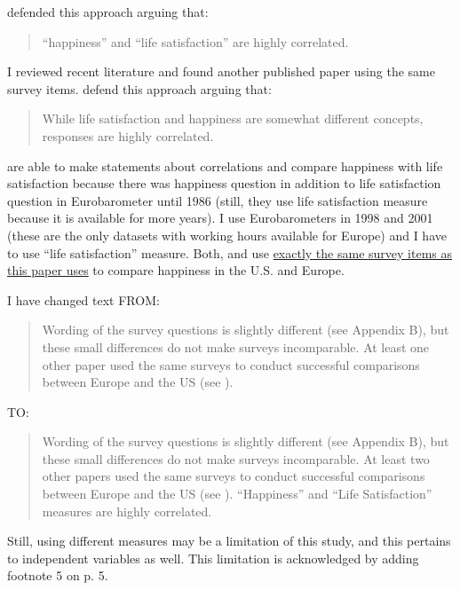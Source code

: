 \noindent\citet[2013/2/11]{alesina03} defended this approach arguing that:
\begin{quote}
 ``happiness'' and ``life satisfaction'' are
highly correlated. 
\end{quote}


\noindent I reviewed recent literature and found another published paper  using the same survey items. \citet[211/2/20]{stevenson09w} defend this approach arguing that:  
\begin{quote}
While life satisfaction and happiness are somewhat different
concepts, responses are highly correlated.
\end{quote}

\noindent \citet{alesina03} \citet{stevenson09w} are able to make statements about correlations and compare
happiness with life satisfaction because there was happiness question in addition to life
satisfaction question in Eurobarometer until 1986
(still, they use life satisfaction measure because it is available for more years).
I use Eurobarometers in 1998 and 2001 (these are the only datasets with working hours available
for Europe) and I have to use ``life satisfaction'' measure. Both, \citet{alesina03} and
\citet{stevenson09w} use \underline{exactly the same survey items as this paper uses} to compare
happiness in the U.S. and Europe.

 I have changed text FROM:

\begin{quote}
 Wording of the
survey questions is slightly
different (see  Appendix B), but these small
differences do not make surveys
incomparable. At least one other paper used the same surveys
to conduct successful comparisons
between Europe and the US (see \citet{alesina03}). 
\end{quote}

\noindent TO:

\begin{quote}
Wording of the
survey questions is slightly
different (see  Appendix B), but these small
differences do not make surveys
incomparable. At least two other papers used the same surveys
to conduct successful comparisons
between Europe and the US (see \citet{alesina03, stevenson09w}). ``Happiness'' and ``Life
Satisfaction'' measures are highly correlated. 
\end{quote}

\noindent Still, using different measures may be a limitation of this study, and this pertains to
independent variables as well. This limitation is acknowledged by adding  
footnote 5 on p. 5.

